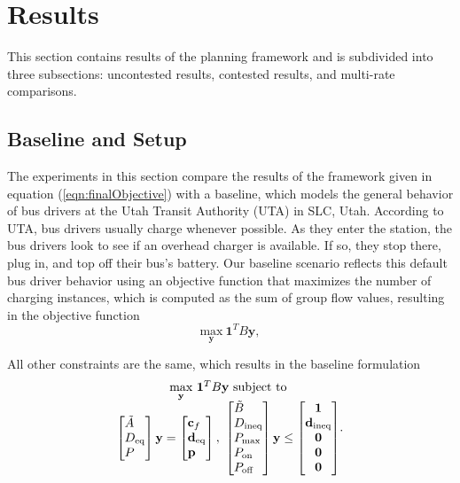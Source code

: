 \section{Results}
This section contains results of the planning framework and is subdivided into three subsections: uncontested results, contested results, and multi-rate comparisons.  
\subsection{\label{sec:setup} Baseline and Setup}
The experiments in this section compare the results of the framework given in equation (\ref{eqn:finalObjective}) with a baseline, which models the general behavior of bus drivers at the Utah Transit Authority (UTA) in SLC, Utah. According to UTA, bus drivers usually charge whenever possible.  As they enter the station, the bus drivers look to see if an overhead charger is available. If so, they stop there, plug in, and top off their bus's battery. Our baseline scenario reflects this default bus driver behavior using an objective function that maximizes the number of charging instances, which is computed as the sum of group flow values, resulting in the objective function
\begin{equation}
	\underset{\mathbf{y}}{\text{max}} \ \mathbf{1}^TB\mathbf{y},
\end{equation}
\par All other constraints are the same, which results in the baseline formulation 
\begin{equation}\label{eqn:finalBaselineObjective}
	\begin{matrix*}[c]
		\underset{\mathbf{y}}{\scalebox{1}{\text{max}}} \ \mathbf{1}^TB\mathbf{y} \ \text{subject to}\\
		\begin{bmatrix*}[l]
				\tilde{A} \\
				D_{\text{eq}} \\
				P
				\end{bmatrix*} \mathbf{y} = \begin{bmatrix*}[l]\mathbf{c}_f \\ \mathbf{d}_{\text{eq}}\\\mathbf{p} \end{bmatrix*}, \ \begin{bmatrix*}[l]
			\tilde{B} \\
			D_{\text{ineq}} \\ 
			P_{\text{max}} \\
			P_{\text{on}} \\
			P_{\text{off}}
			\end{bmatrix*}\mathbf{y} \le \begin{bmatrix*}\mathbf{1} \\ \mathbf{d}_{\text{ineq}} \\ \mathbf{0} \\ \mathbf{0} \\ \mathbf{0} \end{bmatrix*}
	\end{matrix*}.
\end{equation}
